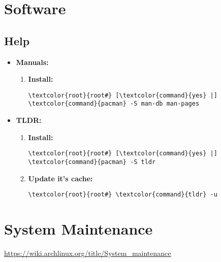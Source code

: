 \documentclass[10pt, a4paper, onecolumn, openany]{book} %
\begin{document}
\chapter{Software}
\section{Help}
\begin{itemize}
    \item \textbf{Manuals:}
    \begin{enumerate}
        \item \textbf{Install:}
\begin{Verbatim}[commandchars=\\\{\}]
\textcolor{root}{root#} [\textcolor{command}{yes} |] \textcolor{command}{pacman} -S man-db man-pages
\end{Verbatim}
    \end{enumerate}

    \item \textbf{TLDR:}
    \begin{enumerate}
        \item \textbf{Install:}
\begin{Verbatim}[commandchars=\\\{\}]
\textcolor{root}{root#} [\textcolor{command}{yes} |] \textcolor{command}{pacman} -S tldr
\end{Verbatim}
        \item \textbf{Update it's cache:}
\begin{Verbatim}[commandchars=\\\{\}]
\textcolor{root}{root#} \textcolor{command}{tldr} -u
\end{Verbatim}
    \end{enumerate}

\end{itemize}

\chapter{System Maintenance}
\underline{\href{https://wiki.archlinux.org/title/System\_maintenance}{https://wiki.archlinux.org/title/System\_maintenance}}
\end{document}
